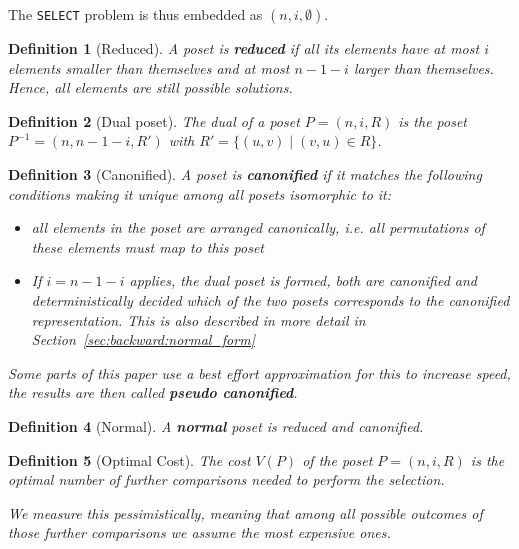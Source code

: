 \documentclass[10pt,journal,compsoc]{IEEEtran}
\newtheorem{definition}{Definition}
\begin{document}
The \texttt{SELECT} problem is thus embedded as $(n, i, \emptyset)$.

\begin{definition}[Reduced] \label{definition:reduced_poset}
  A poset is \textbf{reduced} if all its elements have at most $i$ elements smaller than themselves and at most $n - 1 - i$ larger than themselves.
  Hence, all elements are still possible solutions.
\end{definition}

\begin{definition}[Dual poset] \label{definition:dual_poset}
  The dual of a poset $P = (n, i, R)$ is the poset $P^{-1} = (n, n - 1 - i, R')$ with $R' = \{(u,v) \mid (v,u) \in R\}$.
\end{definition}

\begin{definition}[Canonified]
  A poset is \textbf{canonified} if it matches the following conditions making it unique among all posets isomorphic to it:
  \begin{itemize}
    \item all elements in the poset are arranged canonically, i.e. all permutations of these elements must map to this poset
    \item
          If $i = n - 1 - i$ applies, the dual poset is formed, both are canonified and deterministically decided which of the two posets corresponds to the canonified representation.
          This is also described in more detail in Section~\ref{sec:backward:normal_form}
  \end{itemize}

  Some parts of this paper use a best effort approximation for this to increase speed, the results are then called \textbf{pseudo canonified}.
\end{definition}

\begin{definition}[Normal]
  A \textbf{normal} poset is reduced and canonified.
\end{definition}

\begin{definition}[Optimal Cost]
  The cost $V(P)$ of the poset $P = (n, i, R)$ is the optimal number of further comparisons needed to perform the selection.

  We measure this pessimistically, meaning that among all possible outcomes of those further comparisons we assume the most expensive ones.
\end{definition}
\end{document}
